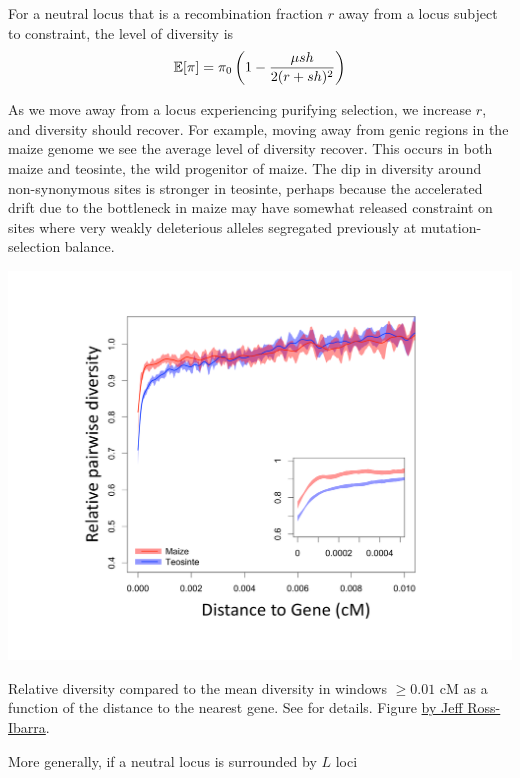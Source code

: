 For a neutral locus that is a recombination fraction $r$ away from a
locus subject to constraint, the level of diversity is
\begin{equation}
\mathbb{E}[\pi] = \pi_0  \left(1-\frac{\mu sh}{2(r+sh)^2} \right) \label{eqn:pi_loc_BGS}
\end{equation}

As we move away from a locus experiencing purifying selection, 
we increase $r$, and diversity should recover. For example, moving away
from genic regions in the maize genome we see the average level of
diversity recover. This occurs in both maize and teosinte, the wild
progenitor of maize. The dip in diversity around non-synonymous sites is stronger in teosinte, perhaps because the accelerated drift due to the
bottleneck in maize
may have somewhat released constraint on sites where very weakly deleterious
alleles segregated previously at mutation-selection balance. 
\begin{marginfigure}
\begin{center}
\includegraphics[width=\textwidth]{Journal_figs/recom_selection/maize_dist_gene/Figure4_beissinger_A.pdf}
\end{center}
\caption{Relative diversity compared to the mean diversity in windows
  $\ge 0.01$ cM as a function of the distance to the nearest gene.
  See \citep{beissinger2016recent} for details. Figure \PLOSccBY
   \href{https://github.com/RILAB/beissinger_ms}{by Jeff Ross-Ibarra}.} \label{fig:BGS_maize}
\end{marginfigure}
More generally, if a neutral locus is surrounded by $L$ loci
